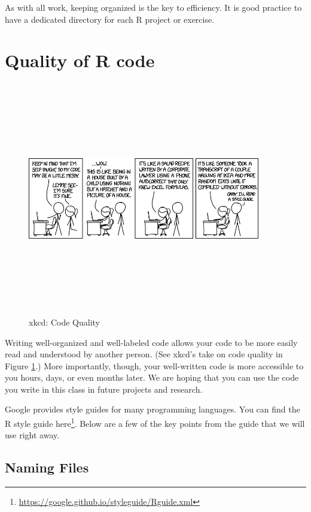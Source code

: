\documentclass[]{krantz}
\renewcommand{\href}[2]{#2\footnote{\url{#1}}}
\begin{document}
As with all work, keeping organized is the key to efficiency. It is good practice to have a dedicated directory for each R project or exercise.

\hypertarget{quality-of-r-code}{%
\section{Quality of R code}\label{quality-of-r-code}}

\begin{figure}
\includegraphics[width=4in,height=4in]{../figures/code_quality} \caption{xkcd: Code Quality}\label{fig:comic}
\end{figure}

Writing well-organized and well-labeled code allows your code to be more easily read and understood by another person. (See xkcd's take on code quality in Figure \ref{fig:comic}.) More importantly, though, your well-written code is more accessible to you hours, days, or even months later. We are hoping that you can use the code you write in this class in future projects and research.

Google provides style guides for many programming languages. You can find the R style guide \href{https://google.github.io/styleguide/Rguide.xml}{here}. Below are a few of the key points from the guide that we will use right away.

\hypertarget{naming-files}{%
\subsection{Naming Files}\label{naming-files}}
\end{document}
